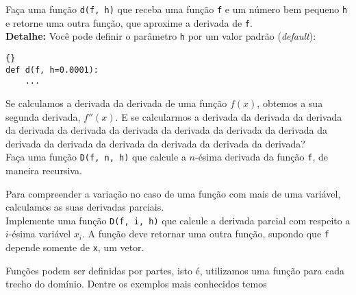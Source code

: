 \documentclass[12pt]{article}
\begin{document}
	\quest Faça uma função \texttt{d(f, h)} que receba uma função \texttt{f} e um número bem pequeno \texttt{h} e retorne uma outra função, que aproxime a derivada de \texttt{f}.\\
	
	\textbf{Detalhe:} Você pode definir o parâmetro \texttt{h} por um valor padrão (\textit{default}):
	
	\begin{lstlisting}{}
def d(f, h=0.0001):
	...
	\end{lstlisting}
	
	
	Se calculamos a derivada da derivada de uma função $f(x)$, obtemos a sua segunda derivada, $f''(x)$. E se calcularmos a derivada da derivada da derivada da derivada da derivada da derivada da derivada da derivada da derivada da derivada da derivada da derivada da derivada da derivada da derivada?\\
	
	\quest Faça uma função \texttt{D(f, n, h)} que calcule a $n$-ésima derivada da função \texttt{f}, de maneira recursiva.
	
	
	Para compreender a variação no caso de uma função com mais de uma variável, calculamos as suas derivadas parciais.\\
	
	\quest Implemente uma função \texttt{D(f, i, h)} que calcule a derivada parcial com respeito a $i$-ésima variável $x_i$. A função deve retornar uma outra função, supondo que \texttt{f} depende somente de \texttt{x}, um vetor.
	
	
	
	Funções podem ser definidas por partes, isto é, utilizamos uma função para cada trecho do domínio. Dentre os exemplos mais conhecidos temos
\end{document}
